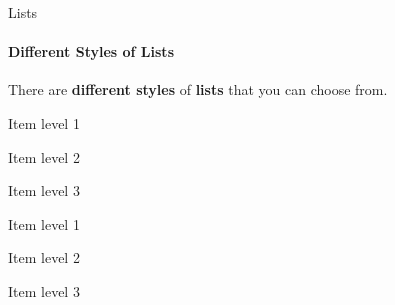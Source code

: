 \documentclass[aspectratio=169]{beamer}
\begin{document}
\begin{frame}{Lists}
    \framesubtitle{Different Styles of Lists}

    \begin{coloredblock}[yellow]
        \centering
        There are \textbf{different styles} of \textbf{lists} that you can choose from.
    \end{coloredblock}

    \vspace{-0.5cm}

    \begin{minipage}[t]{0.49\textwidth}
        \begin{coloredblock}
            \begin{romanenumerate}
                \item Item level 1
                \begin{romanenumerate}
                    \item Item level 2
                    \begin{romanenumerate}
                        \item Item level 3
                    \end{romanenumerate}
                \end{romanenumerate}
            \end{romanenumerate}
        \end{coloredblock}

        \begin{coloredblock}
            \begin{boxenumerate}
            \item Item level 1
                \begin{boxenumerate}
                    \item Item level 2
                    \begin{boxenumerate}
                        \item Item level 3
                    \end{boxenumerate}
                \end{boxenumerate}
            \end{boxenumerate}
        \end{coloredblock}
        

\end{minipage}
\end{frame}
\end{document}
